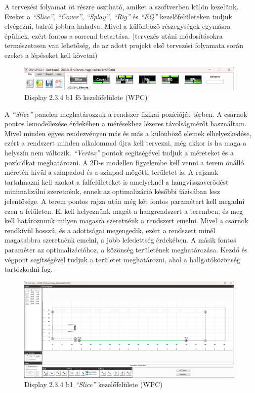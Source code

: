 A tervezési folyamat öt részre osztható, amiket a szoftverben külön kezelünk.
Ezeket a \textit{``Slice''}, \textit{``Cover''}, \textit{``Splay''}, \textit{``Rig''} és \textit{``EQ''} kezelőfelületeken tudjuk elvégezni,
balról jobbra haladva. Mivel a különböző részegységek egymásra épülnek, ezért fontos a sorrend betartása.
(tervezés utáni módosításokra természetesen van lehetőség, de az adott projekt első tervezési folyamata során ezeket a lépéseket kell követni)
\begin{figure}[H]
	\centering
	\includegraphics[width=\textwidth, keepaspectratio]{figures/display_wpc_0_1.png}
	\caption{Display 2.3.4 b1 fő kezelőfelülete (WPC)}\label{fig:display_wpc_0_1}
\end{figure}
A \textit{``Slice''} panelen meghatározzuk a rendszer fizikai pozícióját térben. A csarnok
pontos lemodellezése érdekében a mérésekhez lézeres távolságmérőt használtam.
Mivel minden egyes rendezvényen más és más a különböző elemek elhelyezkedése, ezért a
rendszert minden alkalommal újra kell tervezni, még akkor is ha maga a helyszín nem változik.
\textit{``Vertex''} pontok segítségével tudjuk a méreteket és a pozíciókat meghatározni.
A 2D-s modellen figyelembe kell venni a terem önálló méretén kívül a színpadod és a színpad mögötti területet is.
A rajznak tartalmazni kell azokat a falfelületeket is amelyeknél a hangvisszaverődést minimalizálni szeretnénk,
ennek az optimalizáció későbbi fázisában lesz jelentősége.
A terem pontos rajza után még két fontos paramétert kell megadni ezen a felületen.
El kell helyeznünk magát a hangrendszert a teremben, és meg kell határoznunk milyen magasra szeretnénk a rendszert emelni.
Mivel a csarnok rendkívül hosszú, és a adottságai megengedik, ezért a rendszert minél magasabbra szeretnénk emelni,
a jobb lefedettség érdekében.
A másik fontos paraméter az optimalizációhoz, a közönség területének meghatározása. Kezdő és végpont segítségével
tudjuk a területet meghatározni, ahol a hallgatóközönség tartózkodni fog.
\begin{figure}[H]
	\centering
	\includegraphics[width=\textwidth, keepaspectratio]{figures/display_wpc_1.png}
	\caption{Display 2.3.4 b1 \textit{``Slice''} kezelőfelülete (WPC)}\label{fig:display_wpc_1}
\end{figure}

